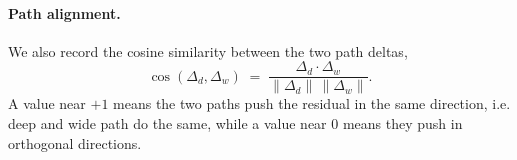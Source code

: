 \documentclass[11pt]{article}
\begin{document}
\paragraph{Path alignment.}
We also record the cosine similarity between the two path
deltas,
\begin{equation}
\label{eq:path-cos}
\cos(\Delta_d, \Delta_w) \;=\;
\frac{\Delta_d \cdot \Delta_w}{\|\Delta_d\|\,\|\Delta_w\|}.
\end{equation}
A value near $+1$ means the two paths push the residual in the
same direction, i.e. deep and wide path do the same, while a value near $0$ means they push in orthogonal directions.
 
 

\end{document}
